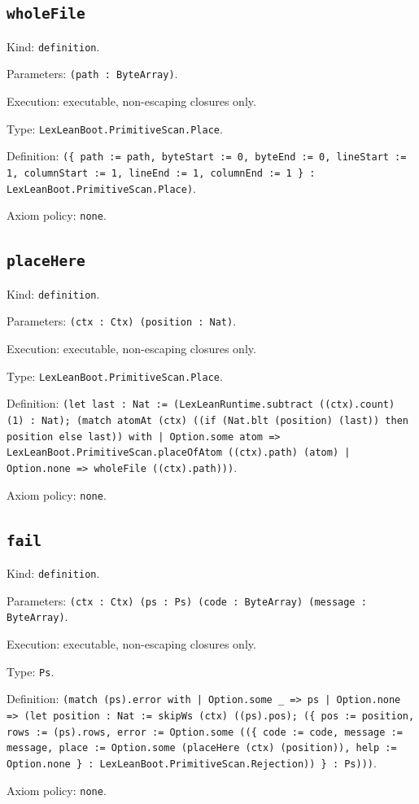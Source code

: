 \documentclass[11pt]{article}
\begin{document}
\subsection*{\texttt{wholeFile}}
\noindent Kind: \texttt{definition}.\par
\noindent Parameters: \texttt{(path : ByteArray)}.\par
\noindent Execution: executable, non-escaping closures only.\par
\noindent Type: \texttt{LexLeanBoot.PrimitiveScan.Place}.\par
\noindent Definition: \texttt{(\{ path := path, byteStart := 0, byteEnd := 0, lineStart := 1, columnStart := 1, lineEnd := 1, columnEnd := 1 \} : LexLeanBoot.PrimitiveScan.Place)}.\par
\noindent Axiom policy: \texttt{none}.\par
\subsection*{\texttt{placeHere}}
\noindent Kind: \texttt{definition}.\par
\noindent Parameters: \texttt{(ctx : Ctx) (position : Nat)}.\par
\noindent Execution: executable, non-escaping closures only.\par
\noindent Type: \texttt{LexLeanBoot.PrimitiveScan.Place}.\par
\noindent Definition: \texttt{(let last : Nat := (LexLeanRuntime.subtract ((ctx).count) (1) : Nat); (match atomAt (ctx) ((if (Nat.blt (position) (last)) then position else last)) with | Option.some atom => LexLeanBoot.PrimitiveScan.placeOfAtom ((ctx).path) (atom) | Option.none => wholeFile ((ctx).path)))}.\par
\noindent Axiom policy: \texttt{none}.\par
\subsection*{\texttt{fail}}
\noindent Kind: \texttt{definition}.\par
\noindent Parameters: \texttt{(ctx : Ctx) (ps : Ps) (code : ByteArray) (message : ByteArray)}.\par
\noindent Execution: executable, non-escaping closures only.\par
\noindent Type: \texttt{Ps}.\par
\noindent Definition: \texttt{(match (ps).error with | Option.some \_ => ps | Option.none => (let position : Nat := skipWs (ctx) ((ps).pos); (\{ pos := position, rows := (ps).rows, error := Option.some ((\{ code := code, message := message, place := Option.some (placeHere (ctx) (position)), help := Option.none \} : LexLeanBoot.PrimitiveScan.Rejection)) \} : Ps)))}.\par
\noindent Axiom policy: \texttt{none}.\par
\end{document}
